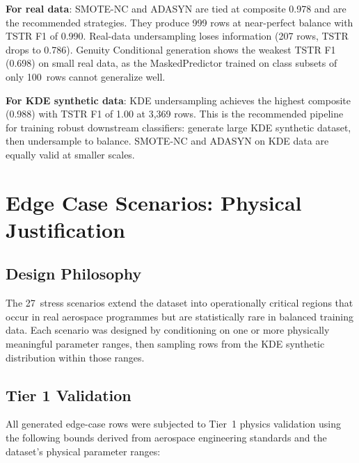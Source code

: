 \documentclass[12pt,a4paper]{article}
\begin{document}
\begin{tcolorbox}[insightbox, title={Strategy Recommendation}]
\textbf{For real data}: SMOTE-NC and ADASYN are tied at composite 0.978 and are the recommended strategies. They produce 999 rows at near-perfect balance with TSTR F1 of 0.990. Real-data undersampling loses information (207 rows, TSTR drops to 0.786). Genuity Conditional generation shows the weakest TSTR F1 (0.698) on small real data, as the MaskedPredictor trained on class subsets of only 100~rows cannot generalize well.

\medskip
\textbf{For KDE synthetic data}: KDE undersampling achieves the highest composite (0.988) with TSTR F1 of 1.00 at 3,369 rows. This is the recommended pipeline for training robust downstream classifiers: generate large KDE synthetic dataset, then undersample to balance. SMOTE-NC and ADASYN on KDE data are equally valid at smaller scales.
\end{tcolorbox}

\section{Edge Case Scenarios: Physical Justification}

\subsection{Design Philosophy}

The 27~stress scenarios extend the dataset into operationally critical regions that occur in real aerospace programmes but are statistically rare in balanced training data. Each scenario was designed by conditioning on one or more physically meaningful parameter ranges, then sampling rows from the KDE synthetic distribution within those ranges.

\subsection{Tier 1 Validation}

All generated edge-case rows were subjected to Tier~1 physics validation using the following bounds derived from aerospace engineering standards and the dataset's physical parameter ranges:
\end{document}
